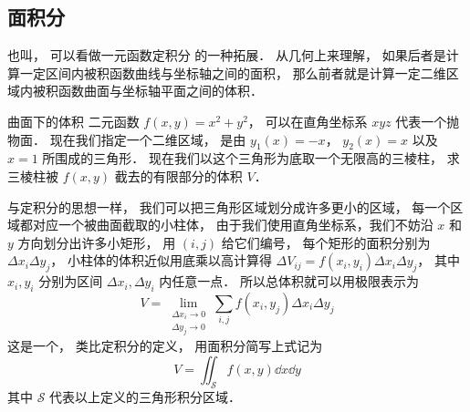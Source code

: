 
\subsection{面积分}
 也叫， 可以看做一元函数定积分 的一种拓展． 从几何上来理解， 如果后者是计算一定区间内被积函数曲线与坐标轴之间的面积， 那么前者就是计算一定二维区域内被积函数曲面与坐标轴平面之间的体积．

\begin{exam}{曲面下的体积}\label{IntN_ex1}
二元函数 $f(x,y) = x^2 + y^2$， 可以在直角坐标系 $xyz$ 代表一个抛物面． 现在我们指定一个二维区域， 是由 $y_1(x) = -x$， $y_2(x) = x$ 以及 $x = 1$ 所围成的三角形． 现在我们以这个三角形为底取一个无限高的三棱柱， 求三棱柱被 $f(x,y)$ 截去的有限部分的体积 $V$．

与定积分的思想一样， 我们可以把三角形区域划分成许多更小的区域， 每一个区域都对应一个被曲面截取的小柱体， 由于我们使用直角坐标系，我们不妨沿 $x$ 和 $y$ 方向划分出许多小矩形， 用 $(i,j)$ 给它们编号， 每个矩形的面积分别为 $\Delta x_i \Delta y_j$， 小柱体的体积近似用底乘以高计算得 $\Delta V_{ij} = f(x_i,y_i) \Delta x_i \Delta y_j$， 其中 $x_i, y_i$ 分别为区间 $\Delta x_i, \Delta y_i$ 内任意一点． 所以总体积就可以用极限表示为
\begin{equation}\label{IntN_eq1}
V = \lim_{\substack{\Delta x_i\to 0\\ \Delta y_j\to 0}} \sum_{i, j} f(x_i,y_j) \Delta x_i \Delta y_j
\end{equation}
这是一个， 类比定积分的定义， 用面积分简写上式记为
\begin{equation}
V = \iint_{\mathcal{S}} f(x,y) \dd{x}\dd{y}
\end{equation}
其中 $\mathcal{S}$ 代表以上定义的三角形积分区域． 


\end{exam}
